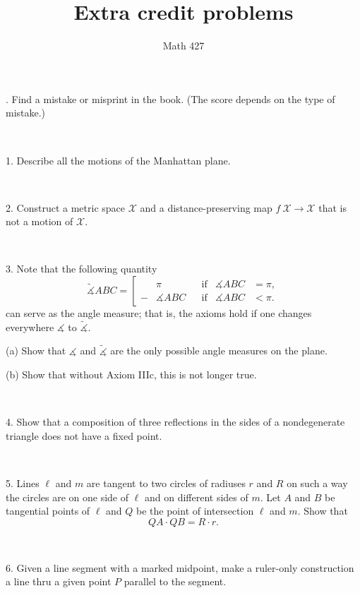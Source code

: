 \documentclass[oneside,a4paper]{article}
\begin{document}
\title{Extra credit problems}
\author{Math 427}
\date{}
\maketitle


. Find a mistake or misprint in the book.
(The score depends on the type of mistake.)

\ 

\noi %
{1.} Describe all the motions of the Manhattan plane.

\ 

\noi %
{2.} %
Construct a metric space $\mathcal X$ and a distance-preserving map $f\:\mathcal X\to \mathcal X$ that is not a motion of $\mathcal X$.

\ 

\noi %
{3.} Note that the following quantity 
$$\tilde
\measuredangle ABC=\left[
\begin{aligned}
&\pi&&\text{if}&\measuredangle ABC&=\pi,
\\
-&\measuredangle ABC&&\text{if}&\measuredangle ABC&<\pi.
\end{aligned}
\right.$$
can serve as the angle measure; 
that is, the axioms hold if one changes everywhere $\measuredangle$ to $\tilde\measuredangle$.

\noi (a) Show that $\measuredangle$ and $\tilde\measuredangle$ are the only possible angle measures on the plane. 

\noi (b) Show that without Axiom IIIc, this is not longer true.

\ 

\noi %
{4.} %
Show that a composition of three reflections in the sides of a nondegenerate triangle does not have a fixed point.

\ 

\noi %
{5.} %
Lines $\ell$ and $m$ are tangent to two circles of radiuses $r$ and $R$ on such
a way the circles are on one side of $\ell$ and on different sides of $m$. 
Let $A$ and $B$ be
tangential points of $\ell$ and $Q$ be the point of intersection $\ell$ and $m$. 
Show that
$$QA\cdot QB = R\cdot r.$$

\ 

\noi %
{6.} %
Given a line segment with a marked midpoint, make a ruler-only construction a line thru a given point $P$ parallel to the segment.
\end{document}
